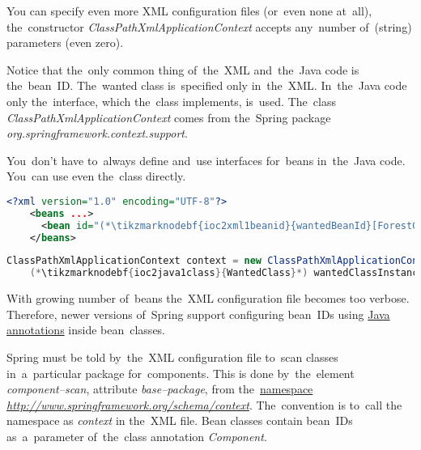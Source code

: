 \noindent You can specify even more XML configuration files (or~even none at~all), the~constructor \textit{ClassPathXmlApplicationContext} accepts any~number of~(string) parameters (even zero).

Notice that the~only common thing of~the~XML and~the~Java code is the~bean~ID. The~wanted class is~specified only in~the~XML. In~the~Java code only the~interface, which the~class implements, is~used. The~class \textit{ClassPathXmlApplicationContext} comes from the~Spring package \textit{org.springframework.context.support}.

\newline\note You~don't have to~always define and~use interfaces for~beans in~the~Java code. You~can use even the~class directly.

\example
\begin{lstlisting}[language=XML, title={Configuration XML}]
    <?xml version="1.0" encoding="UTF-8"?>
    <beans ...>
      <bean id="(*\tikzmarknodebf{ioc2xml1beanid}{wantedBeanId}[ForestGreen]*)" class="package.subfolder.(*\tikzmarknodebf{ioc2xml1class}{WantedClass}[ForestGreen]*)"/>
    </beans>
\end{lstlisting}
\begin{lstlisting}[language=Java, title={Usage}]
    ClassPathXmlApplicationContext context = new ClassPathXmlApplicationContext("configurationFile.xml");
    (*\tikzmarknodebf{ioc2java1class}{WantedClass}*) wantedClassInstance = context.getBean("(*\tikzmarknodebf{ioc2java1beanid}{wantedBeanId}[ForestGreen]*)", (*\tikzmarknodebf{ioc2java1class2}{WantedClass}*).class);
\end{lstlisting}
\newpage

\label{usingjavaannotations}
With growing number of~beans the~XML configuration file becomes too verbose. Therefore, newer versions of~Spring support configuring bean~IDs using \hyperref[javaannotation]{Java annotations} inside bean~classes.

Spring must be told by~the~XML configuration file to~scan classes in~a~particular package for~components. This is done by~the~element \textit{component--scan}, attribute \textit{base--package}, from the~\hyperref[namespaces]{namespace} \textit{\href{http://www.springframework.org/schema/context}{http://www.springframework.org/schema/context}}. The~convention is to~call the namespace as \textit{context} in the~XML file. Bean classes contain bean~IDs as~a~parameter of~the~class annotation \textit{Component}.

